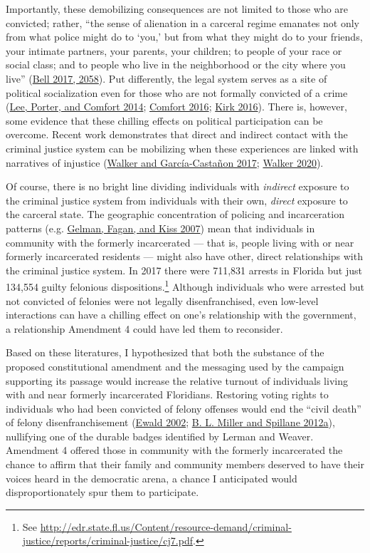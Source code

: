 \documentclass[
  12pt,
]{article}
\begin{document}
Importantly, these demobilizing consequences are not limited to those who are convicted; rather, ``the sense of alienation in a carceral regime emanates not only from what police might do to `you,' but from what they might do to your friends, your intimate partners, your parents, your children; to people of your race or social class; and to people who live in the neighborhood or the city where you live'' (\protect\hyperlink{ref-Bell2017}{Bell 2017, 2058}). Put differently, the legal system serves as a site of political socialization even for those who are not formally convicted of a crime (\protect\hyperlink{ref-Lee2014}{Lee, Porter, and Comfort 2014}; \protect\hyperlink{ref-Comfort2016}{Comfort 2016}; \protect\hyperlink{ref-Kirk2016}{Kirk 2016}). There is, however, some evidence that these chilling effects on political participation can be overcome. Recent work demonstrates that direct and indirect contact with the criminal justice system can be mobilizing when these experiences are linked with narratives of injustice (\protect\hyperlink{ref-Walker2017}{Walker and García-Castañon 2017}; \protect\hyperlink{ref-Walker2020}{Walker 2020}).

Of course, there is no bright line dividing individuals with \emph{indirect} exposure to the criminal justice system from individuals with their own, \emph{direct} exposure to the carceral state. The geographic concentration of policing and incarceration patterns (e.g. \protect\hyperlink{ref-Gelman2007}{Gelman, Fagan, and Kiss 2007}) mean that individuals in community with the formerly incarcerated --- that is, people living with or near formerly incarcerated residents --- might also have other, direct relationships with the criminal justice system. In 2017 there were 711,831 arrests in Florida but just 134,554 guilty felonious dispositions.\footnote{See \url{http://edr.state.fl.us/Content/resource-demand/criminal-justice/reports/criminal-justice/cj7.pdf}.} Although individuals who were arrested but not convicted of felonies were not legally disenfranchised, even low-level interactions can have a chilling effect on one's relationship with the government, a relationship Amendment 4 could have led them to reconsider.

Based on these literatures, I hypothesized that both the substance of the proposed constitutional amendment and the messaging used by the campaign supporting its passage would increase the relative turnout of individuals living with and near formerly incarcerated Floridians. Restoring voting rights to individuals who had been convicted of felony offenses would end the ``civil death'' of felony disenfranchisement (\protect\hyperlink{ref-Ewald2002}{Ewald 2002}; \protect\hyperlink{ref-Miller2012}{B. L. Miller and Spillane 2012a}), nullifying one of the durable badges identified by Lerman and Weaver. Amendment 4 offered those in community with the formerly incarcerated the chance to affirm that their family and community members deserved to have their voices heard in the democratic arena, a chance I anticipated would disproportionately spur them to participate.
\end{document}
